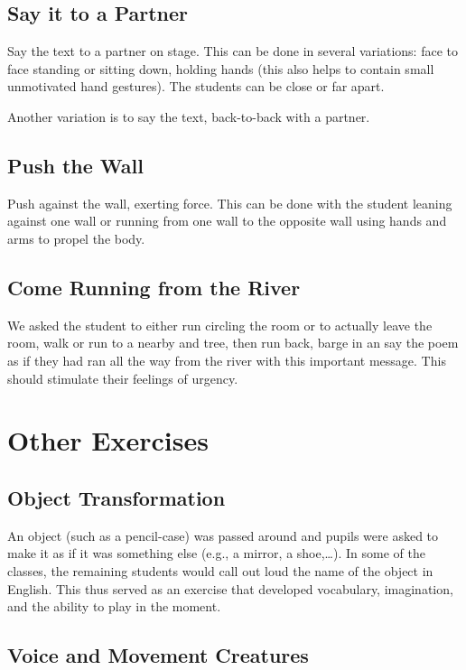 \documentclass[article,twocolumn,twoside]{memoir}
\begin{document}
\subsection{Say it to a Partner}

Say the text to a partner on stage. This can be done in several variations:
face to face standing or sitting down, holding hands (this also helps to
contain small unmotivated hand gestures). The students can be close or far apart.

Another variation is to say the text, back-to-back with a partner.

\subsection{Push the Wall}

Push against the wall, exerting force. This can be done with the student
leaning against one wall or running from one wall to the opposite wall using
hands and arms to propel the body.

\subsection{Come Running from the River}

We asked the student to either run circling the room or to actually leave the
room, walk or run to a nearby and tree, then run back, barge in an say the poem
as if they had ran all the way from the river with this important message. This
should stimulate their feelings of urgency.

\section{Other Exercises}
\subsection{Object Transformation}
An object (such as a pencil-case) was passed around and pupils were asked to
make it as if it was something else (e.g., a mirror, a shoe,\dots). In some of
the classes, the remaining students would call out loud the name of the object
in English. This thus served as an exercise that developed vocabulary, imagination,
and the ability to play in the moment.

\subsection{Voice and Movement Creatures}
\end{document}
